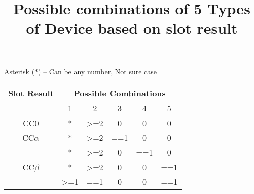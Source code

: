 \documentclass[fleqn]{article}
\begin{document}
\title{Possible combinations of 5 Types of Device based on slot result}

\maketitle{}

Asterisk (*) – Can be any number, Not sure case 

\begin {table} [h]
\centering
\begin{tabular}{|c|c|c|c|c|c|}
\hline
\multicolumn{1}{|c|}{Slot Result}                        & \multicolumn{5}{c|}{Possible Combinations}                                                                                                                                               \\ \hline
\multicolumn{1}{|c|}{}                                   & \multicolumn{1}{c|}{1}                & \multicolumn{1}{c|}{2}                & \multicolumn{1}{c|}{3}   & \multicolumn{1}{c|}{4}                & \multicolumn{1}{c|}{5}                \\ \hline
\multicolumn{1}{|c|}{CC0}                                & \multicolumn{1}{c|}{*}                & \multicolumn{1}{c|}{\textgreater{}=2} & \multicolumn{1}{c|}{0}   & \multicolumn{1}{c|}{0}                & \multicolumn{1}{c|}{0}                \\ \hline
\multicolumn{1}{|c|}{CC$\alpha$}                         & \multicolumn{1}{c|}{*}                & \multicolumn{1}{c|}{\textgreater{}=2} & \multicolumn{1}{c|}{==1} & \multicolumn{1}{c|}{0}                & \multicolumn{1}{c|}{0}                \\ \hline
\multicolumn{1}{|c|}{\multirow{3}{*}{CC$\beta$}}         & \multicolumn{1}{c|}{*}                & \multicolumn{1}{c|}{\textgreater{}=2} & \multicolumn{1}{c|}{0}   & \multicolumn{1}{c|}{==1}              & \multicolumn{1}{c|}{0}                \\ \cline{2-6} 
\multicolumn{1}{|c|}{}                                   & \multicolumn{1}{c|}{*}                & \multicolumn{1}{c|}{\textgreater{}=2} & \multicolumn{1}{c|}{0}   & \multicolumn{1}{c|}{0}                & \multicolumn{1}{c|}{==1}              \\ \cline{2-6} 
\multicolumn{1}{|c|}{}                                   & \multicolumn{1}{c|}{\textgreater{}=1} & \multicolumn{1}{c|}{==1}              & \multicolumn{1}{c|}{0}   & \multicolumn{1}{c|}{0}                & \multicolumn{1}{c|}{==1}              \\ \hline

\end{tabular}
\end{table}
\end{document}
